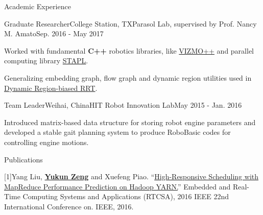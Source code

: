 \documentclass{resume} %
\begin{document}
\begin{rSection}{Academic Experience}

\begin{rSubsection}{Graduate Researcher}{College Station, TX}{Parasol Lab, supervised by Prof. Nancy M. Amato}{Sep. 2016 - May 2017}
\item Worked with fundamental \textbf{C++} robotics libraries, like \href{https://parasol.tamu.edu/groups/amatogroup/research/UserGuided/Old/vizmo++/}{VIZMO++} and parallel computing library \href{https://parasol.tamu.edu/groups/rwergergroup/research/stapl/}{STAPL}.
\item Generalizing embedding graph, flow graph and dynamic region utilities used in \href{http://wafr2016.berkeley.edu/papers/WAFR_2016_paper_36.pdf}{Dynamic Region-biased RRT}.
\end{rSubsection}

\begin{rSubsection}{Team Leader}{Weihai, China}{HIT Robot Innovation Lab}{May 2015 - Jan. 2016}
\item Introduced matrix-based data structure for storing robot engine parameters and developed a stable gait planning system to produce RoboBasic codes for controlling engine motions.
\end{rSubsection}

\end{rSection}

\begin{rSection}{Publications}

{[1]Yang Liu, }\underline{\bf Yukun Zeng}{ and Xuefeng Piao. ``\href{http://ieeexplore.ieee.org/document/7579961/}{High-Responsive Scheduling with MapReduce Performance Prediction on Hadoop YARN.}'' Embedded and Real-Time Computing Systems and Applications (RTCSA), 2016 IEEE 22nd International Conference on. IEEE, 2016.
}

\end{rSection}
\end{document}
